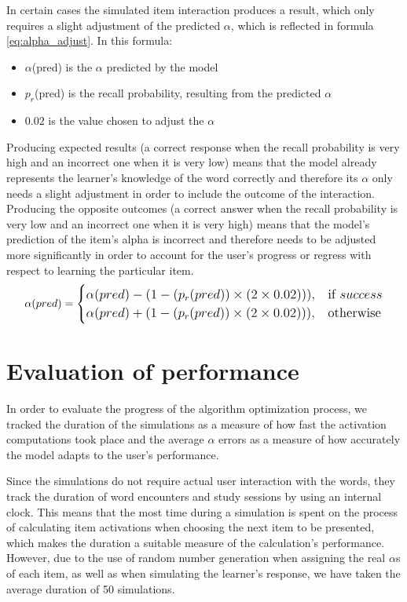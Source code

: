 \documentclass[a4paper]{report}
\begin{document}
In certain cases the simulated item interaction produces a result, which only requires a slight adjustment of the predicted $\alpha$, which is reflected in formula \ref{eq:alpha_adjust}. In this formula:
\begin{itemize}
    \item $\alpha$(pred) is the $\alpha$ predicted by the model
    \item $p_r$(pred) is the recall probability, resulting from the predicted $\alpha$
    \item $0.02$ is the value chosen to adjust the $\alpha$
\end{itemize}
Producing expected results (a correct response when the recall probability is very high and an incorrect one when it is very low) means that the model already represents the learner's knowledge of the word correctly and therefore its $\alpha$ only needs a slight adjustment in order to include the outcome of the interaction. Producing the opposite outcomes (a correct answer when the recall probability is very low and an incorrect one when it is very high) means that the model's prediction of the item's alpha is incorrect and therefore needs to be adjusted more significantly in order to account for the user's progress or regress with respect to learning the particular item.
\begin{equation}
\begin{large}
\label{eq:alpha_adjust}
\alpha(pred) = 
\begin{cases}
    \alpha(pred) - (1 - (p_r(pred)) \times (2 \times 0.02))), & \text{if } success\\
    \alpha(pred) + (1 - (p_r(pred)) \times (2 \times 0.02))),  & \text{otherwise}
\end{cases}
\end{large}
\end{equation}

\section{Evaluation of performance}
In order to evaluate the progress of the algorithm optimization process, we tracked the duration of the simulations as a measure of how fast the activation computations took place and the average $\alpha$ errors as a measure of how accurately the model adapts to the user's performance.

Since the simulations do not require actual user interaction with the words, they track the duration of word encounters and study sessions by using an internal clock. This means that the most time during a simulation is spent on the process of calculating item activations when choosing the next item to be presented, which makes the duration a suitable measure of the calculation's performance. However, due to the use of random number generation when assigning the real $\alpha$s of each item, as well as when simulating the learner's response, we have taken the average duration of 50 simulations.
\end{document}
